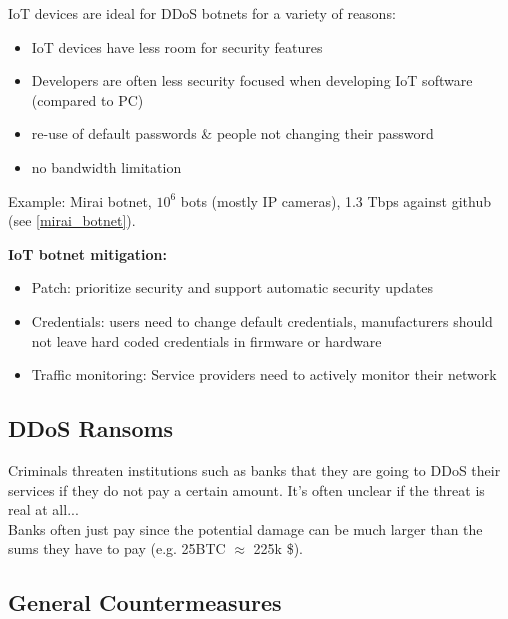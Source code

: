 \documentclass[11pt,oneside,a4paper]{article}
\begin{document}
IoT devices are ideal for DDoS botnets for a variety of reasons:

\vspace{-\topsep}
\begin{itemize}
	\setlength{\itemsep}{0pt}
	\setlength{\parskip}{0pt}
	\item IoT devices have less room for security features
	\item Developers are often less security focused when developing IoT software (compared to PC)
	\item re-use of default passwords \& people not changing their password
	\item no bandwidth limitation
\end{itemize}
\vspace{-\topsep}

Example: Mirai botnet, $10^6$ bots (mostly IP cameras), 1.3 Tbps against github (see \ref{mirai_botnet}).

\textbf{IoT botnet mitigation:}

\vspace{-\topsep}
\begin{itemize}
	\setlength{\itemsep}{0pt}
	\setlength{\parskip}{0pt}
	\item Patch: prioritize security and support automatic security updates
	\item Credentials: users need to change default credentials, manufacturers should not leave hard coded credentials in firmware or hardware
	\item Traffic monitoring: Service providers need to	actively monitor their network
\end{itemize}
\vspace{-\topsep}

\subsection{DDoS Ransoms}

Criminals threaten institutions such as banks that they are going to DDoS their services if they do not pay a certain amount. It's often unclear if the threat is real at all...\\
Banks often just pay since the potential damage can be much larger than the sums they have to pay (e.g. 25BTC $\approx$ 225k \$).

\subsection{General Countermeasures}
\end{document}
